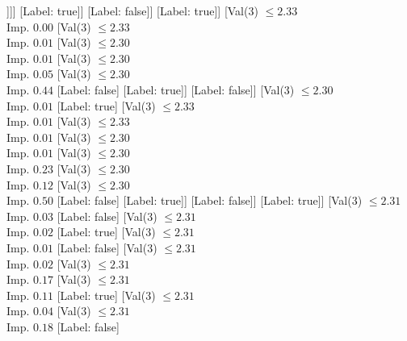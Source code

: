\documentclass[margin=10pt]{standalone}
\begin{document}
\begin{forest}
																[Label: false]
																[Val($3$) $ \leq 2.29$ \\ Imp. $0.50$
																	[Label: true]
																	[Label: false]]]]
														[Label: true]]
													[Label: false]]
												[Label: true]]
											[Val($3$) $ \leq 2.33$ \\ Imp. $0.00$
												[Val($3$) $ \leq 2.33$ \\ Imp. $0.01$
													[Val($3$) $ \leq 2.30$ \\ Imp. $0.01$
														[Val($3$) $ \leq 2.30$ \\ Imp. $0.05$
															[Val($3$) $ \leq 2.30$ \\ Imp. $0.44$
																[Label: false]
																[Label: true]]
															[Label: false]]
														[Val($3$) $ \leq 2.30$ \\ Imp. $0.01$
															[Label: true]
															[Val($3$) $ \leq 2.33$ \\ Imp. $0.01$
																[Val($3$) $ \leq 2.33$ \\ Imp. $0.01$
																	[Val($3$) $ \leq 2.30$ \\ Imp. $0.01$
																		[Val($3$) $ \leq 2.30$ \\ Imp. $0.23$
																			[Val($3$) $ \leq 2.30$ \\ Imp. $0.12$
																				[Val($3$) $ \leq 2.30$ \\ Imp. $0.50$
																					[Label: false]
																					[Label: true]]
																				[Label: false]]
																			[Label: true]]
																		[Val($3$) $ \leq 2.31$ \\ Imp. $0.03$
																			[Label: false]
																			[Val($3$) $ \leq 2.31$ \\ Imp. $0.02$
																				[Label: true]
																				[Val($3$) $ \leq 2.31$ \\ Imp. $0.01$
																					[Label: false]
																					[Val($3$) $ \leq 2.31$ \\ Imp. $0.02$
																						[Val($3$) $ \leq 2.31$ \\ Imp. $0.17$
																							[Val($3$) $ \leq 2.31$ \\ Imp. $0.11$
																								[Label: true]
																								[Val($3$) $ \leq 2.31$ \\ Imp. $0.04$
																									[Val($3$) $ \leq 2.31$ \\ Imp. $0.18$
																										[Label: false]

\end{forest}
\end{document}
